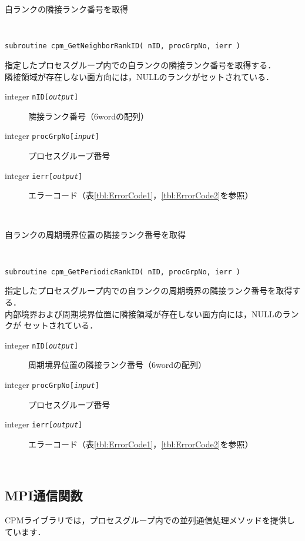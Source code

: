 \begin{spacing}{0.8}
\begin{itembox}[l]{自ランクの隣接ランク番号を取得}
{\tt
\begin{verbatim}
subroutine cpm_GetNeighborRankID( nID, procGrpNo, ierr )
\end{verbatim}
}
指定したプロセスグループ内での自ランクの隣接ランク番号を取得する．\\
隣接領域が存在しない面方向には，NULLのランクがセットされている．
\begin{description}
\item[integer {\tt nID[{\it output}]}] 隣接ランク番号（6wordの配列）
\item[integer {\tt procGrpNo[{\it input}]}] プロセスグループ番号
\item[integer {\tt ierr[{\it output}]}] エラーコード（表\ref{tbl:ErrorCode1}，\ref{tbl:ErrorCode2}を参照）
\end{description}
\end{itembox}\\
\end{spacing}

\begin{spacing}{0.8}
\begin{itembox}[l]{自ランクの周期境界位置の隣接ランク番号を取得}
{\tt
\begin{verbatim}
subroutine cpm_GetPeriodicRankID( nID, procGrpNo, ierr )
\end{verbatim}
}
指定したプロセスグループ内での自ランクの周期境界の隣接ランク番号を取得する．\\
内部境界および周期境界位置に隣接領域が存在しない面方向には，NULLのランクが
セットされている．
\begin{description}
\item[integer {\tt nID[{\it output}]}] 周期境界位置の隣接ランク番号（6wordの配列）
\item[integer {\tt procGrpNo[{\it input}]}] プロセスグループ番号
\item[integer {\tt ierr[{\it output}]}] エラーコード（表\ref{tbl:ErrorCode1}，\ref{tbl:ErrorCode2}を参照）
\end{description}
\end{itembox}\\
\end{spacing}


\clearpage


\subsection{MPI通信関数}
\label{mpifuncF}
CPMライブラリでは，プロセスグループ内での並列通信処理メソッドを提供しています．

